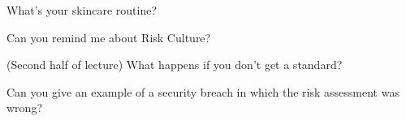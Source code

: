 \item What's your skincare routine? 
\item Can you remind me about Risk Culture?  
\item (Second half of lecture) What happens if you don't get a standard? 
\item Can you give an example of a security breach in which the risk assessment was wrong?   
